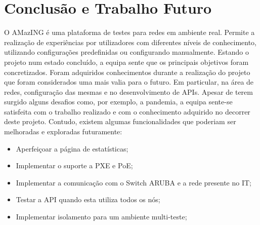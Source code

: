 \chapter{Conclusão e Trabalho Futuro}
O AMazING é uma plataforma de testes para redes em ambiente real. Permite a realização de experiências por utilizadores com diferentes níveis de conhecimento, utilizando configurações predefinidas ou configurando manualmente.\newline
Estando o projeto num estado concluído, a equipa sente que os principais objetivos foram concretizados. Foram adquiridos conhecimentos durante a realização do projeto que foram considerados uma mais valia para o futuro. Em particular, na área de redes, configuração das mesmas e no desenvolvimento de APIs.\newline
Apesar de terem surgido alguns desafios como, por exemplo, a pandemia, a equipa sente-se satisfeita com o trabalho realizado e com o conhecimento adquirido no decorrer deste projeto. Contudo, existem algumas funcionalidades que poderiam ser melhoradas e exploradas futuramente:
\begin{itemize}
    \item Aperfeiçoar a página de estatísticas;
    \item Implementar o suporte a PXE e PoE;
    \item Implementar a comunicação com o Switch ARUBA e a rede presente no IT;
    \item Testar a API quando esta utiliza todos os nós;
    \item Implementar isolamento para um ambiente multi-teste;
\end{itemize}
\newpage
\hfill\break